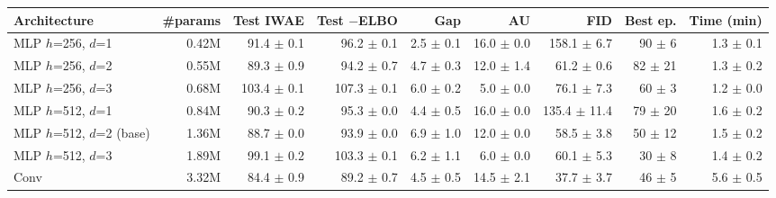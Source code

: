 \begin{tabular}{lrrrrrrrr}
\toprule
Architecture & \#params & Test IWAE & Test $-$ELBO & Gap & AU & FID & Best ep. & Time (min) \\
\midrule
MLP $h$=256, $d$=1 & 0.42M & 91.4 $\pm$ 0.1 & 96.2 $\pm$ 0.1 & 2.5 $\pm$ 0.1 & 16.0 $\pm$ 0.0 & 158.1 $\pm$ 6.7 & 90 $\pm$ 6 & 1.3 $\pm$ 0.1 \\
MLP $h$=256, $d$=2 & 0.55M & 89.3 $\pm$ 0.9 & 94.2 $\pm$ 0.7 & 4.7 $\pm$ 0.3 & 12.0 $\pm$ 1.4 & 61.2 $\pm$ 0.6 & 82 $\pm$ 21 & 1.3 $\pm$ 0.2 \\
MLP $h$=256, $d$=3 & 0.68M & 103.4 $\pm$ 0.1 & 107.3 $\pm$ 0.1 & 6.0 $\pm$ 0.2 & 5.0 $\pm$ 0.0 & 76.1 $\pm$ 7.3 & 60 $\pm$ 3 & 1.2 $\pm$ 0.0 \\
MLP $h$=512, $d$=1 & 0.84M & 90.3 $\pm$ 0.2 & 95.3 $\pm$ 0.0 & 4.4 $\pm$ 0.5 & 16.0 $\pm$ 0.0 & 135.4 $\pm$ 11.4 & 79 $\pm$ 20 & 1.6 $\pm$ 0.2 \\
MLP $h$=512, $d$=2 (base) & 1.36M & 88.7 $\pm$ 0.0 & 93.9 $\pm$ 0.0 & 6.9 $\pm$ 1.0 & 12.0 $\pm$ 0.0 & 58.5 $\pm$ 3.8 & 50 $\pm$ 12 & 1.5 $\pm$ 0.2 \\
MLP $h$=512, $d$=3 & 1.89M & 99.1 $\pm$ 0.2 & 103.3 $\pm$ 0.1 & 6.2 $\pm$ 1.1 & 6.0 $\pm$ 0.0 & 60.1 $\pm$ 5.3 & 30 $\pm$ 8 & 1.4 $\pm$ 0.2 \\
Conv & 3.32M & 84.4 $\pm$ 0.9 & 89.2 $\pm$ 0.7 & 4.5 $\pm$ 0.5 & 14.5 $\pm$ 2.1 & 37.7 $\pm$ 3.7 & 46 $\pm$ 5 & 5.6 $\pm$ 0.5 \\
\bottomrule
\end{tabular}
